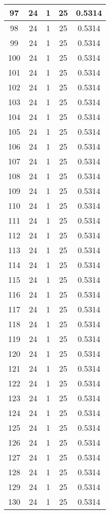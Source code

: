 \documentclass[letterpaper, 12pt]{article}
\begin{document}
\begin{longtable}{|c|c|c|c|c|}
\hline
97 & 24 & 1 & 25 & 0.5314 \\
\hline
98 & 24 & 1 & 25 & 0.5314 \\
\hline
99 & 24 & 1 & 25 & 0.5314 \\
\hline
100 & 24 & 1 & 25 & 0.5314 \\
\hline
101 & 24 & 1 & 25 & 0.5314 \\
\hline
102 & 24 & 1 & 25 & 0.5314 \\
\hline
103 & 24 & 1 & 25 & 0.5314 \\
\hline
104 & 24 & 1 & 25 & 0.5314 \\
\hline
105 & 24 & 1 & 25 & 0.5314 \\
\hline
106 & 24 & 1 & 25 & 0.5314 \\
\hline
107 & 24 & 1 & 25 & 0.5314 \\
\hline
108 & 24 & 1 & 25 & 0.5314 \\
\hline
109 & 24 & 1 & 25 & 0.5314 \\
\hline
110 & 24 & 1 & 25 & 0.5314 \\
\hline
111 & 24 & 1 & 25 & 0.5314 \\
\hline
112 & 24 & 1 & 25 & 0.5314 \\
\hline
113 & 24 & 1 & 25 & 0.5314 \\
\hline
114 & 24 & 1 & 25 & 0.5314 \\
\hline
115 & 24 & 1 & 25 & 0.5314 \\
\hline
116 & 24 & 1 & 25 & 0.5314 \\
\hline
117 & 24 & 1 & 25 & 0.5314 \\
\hline
118 & 24 & 1 & 25 & 0.5314 \\
\hline
119 & 24 & 1 & 25 & 0.5314 \\
\hline
120 & 24 & 1 & 25 & 0.5314 \\
\hline
121 & 24 & 1 & 25 & 0.5314 \\
\hline
122 & 24 & 1 & 25 & 0.5314 \\
\hline
123 & 24 & 1 & 25 & 0.5314 \\
\hline
124 & 24 & 1 & 25 & 0.5314 \\
\hline
125 & 24 & 1 & 25 & 0.5314 \\
\hline
126 & 24 & 1 & 25 & 0.5314 \\
\hline
127 & 24 & 1 & 25 & 0.5314 \\
\hline
128 & 24 & 1 & 25 & 0.5314 \\
\hline
129 & 24 & 1 & 25 & 0.5314 \\
\hline
130 & 24 & 1 & 25 & 0.5314 \\

\end{longtable}
\end{document}
